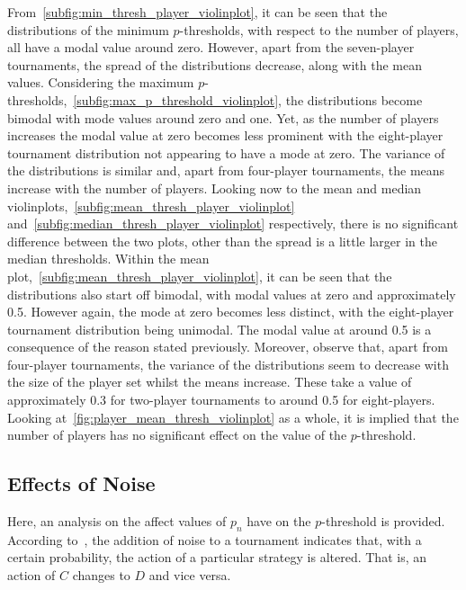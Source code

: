 From~\autoref{subfig:min_thresh_player_violinplot}, it can be seen that the
distributions of the minimum \(p\)-thresholds, with respect to the number of
players, all have a modal value around zero. However, apart from the seven-player
tournaments, the spread of the distributions decrease, along with the mean
values. Considering the maximum \(p\)-thresholds,~\autoref{subfig:max_p_threshold_violinplot}, the distributions become bimodal
with mode values around zero and one. Yet, as the number of players increases the
modal value at zero becomes less prominent with the eight-player tournament
distribution not appearing to have a mode at zero. The variance of the distributions is
similar and, apart from four-player tournaments, the means increase with the number
of players. Looking now to the mean and median violinplots,~\autoref{subfig:mean_thresh_player_violinplot}
and~\autoref{subfig:median_thresh_player_violinplot} respectively, there is no
significant difference between the two plots, other than the spread is a little
larger in the median thresholds. Within the mean plot,~\autoref{subfig:mean_thresh_player_violinplot}, it can be seen that the
distributions also start off bimodal, with modal values at zero and approximately 0.5. However again, the
mode at zero becomes less distinct, with the eight-player tournament
distribution being unimodal. The modal value at around 0.5 is a consequence of
the reason stated previously. Moreover, observe that, apart from
four-player tournaments, the variance of the distributions seem to decrease with
the size of the player set whilst the means increase. These take a value of
approximately 0.3 for two-player tournaments to around 0.5 for eight-players. Looking
at~\autoref{fig:player_mean_thresh_violinplot} as a whole, it is implied
that the number of players has no significant effect on the value of the
\(p\)-threshold.


\subsection{Effects of Noise}\label{subsec:Effects_of_Noise}
Here, an analysis on the affect values of \(p_{n}\) have on the \(p\)-threshold is provided.
According to~\cite{glynatsi2020meta}, the addition of noise to a tournament indicates that, with a certain
probability, the action of a particular strategy is
altered. That is, an action of \(C\) changes to \(D\) and vice versa.  


